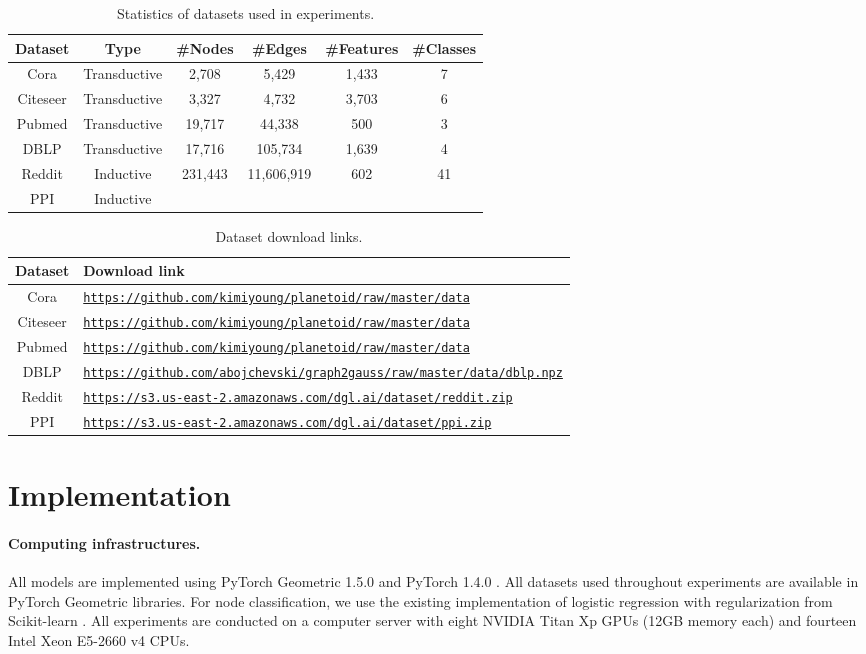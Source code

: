 \documentclass{article}
\theoremstyle{remark}
\begin{document}
\begin{table}[h]
	\centering
	\caption{Statistics of datasets used in experiments.}
	\label{tab:dataset-statistics}
\begin{tabular}{cccccc}
	\toprule
	Dataset & Type & \#Nodes & \#Edges & \#Features & \#Classes \\
	\midrule
	Cora & Transductive & 2,708 & 5,429 & 1,433 & 7 \\
	Citeseer & Transductive & 3,327 & 4,732 & 3,703 & 6 \\
	Pubmed & Transductive & 19,717 & 44,338 & 500 & 3 \\
	DBLP & Transductive & 17,716 & 105,734 & 1,639 & 4 \\
	\midrule
	Reddit & Inductive & 231,443 & 11,606,919 & 602 & 41 \\
	PPI & Inductive & \makecell{56,944 \multilabel)} \\
	\bottomrule
	\end{tabular}
\end{table}

\begin{table}[h]
	\small
	\centering
	\caption{Dataset download links.}
	\begin{tabular}{cl}
		\toprule
		Dataset & Download link \\
		\midrule
		Cora & \texttt{\url{https://github.com/kimiyoung/planetoid/raw/master/data}} \\
		Citeseer & \texttt{\url{https://github.com/kimiyoung/planetoid/raw/master/data}} \\
		Pubmed & \texttt{\url{https://github.com/kimiyoung/planetoid/raw/master/data}} \\
		DBLP & \texttt{\url{https://github.com/abojchevski/graph2gauss/raw/master/data/dblp.npz}} \\
		\midrule
		Reddit & \texttt{\url{https://s3.us-east-2.amazonaws.com/dgl.ai/dataset/reddit.zip}} \\
		PPI & \texttt{\url{https://s3.us-east-2.amazonaws.com/dgl.ai/dataset/ppi.zip}} \\
		\bottomrule
	\end{tabular}
	\label{tab:dataset-links}
\end{table}

\section{Implementation}
\label{appendix:implementation}

\paragraph{Computing infrastructures.}
All models are implemented using PyTorch Geometric 1.5.0 \cite{Fey:2019wv} and PyTorch 1.4.0 \cite{Paszke:2019vf}. All datasets used throughout experiments are available in PyTorch Geometric libraries. For node classification, we use the existing implementation of logistic regression with  regularization from Scikit-learn \cite{Pedregosa:2011cx}. All experiments are conducted on a computer server with eight NVIDIA Titan Xp GPUs (12GB memory each) and fourteen Intel Xeon E5-2660 v4 CPUs.
\end{document}
